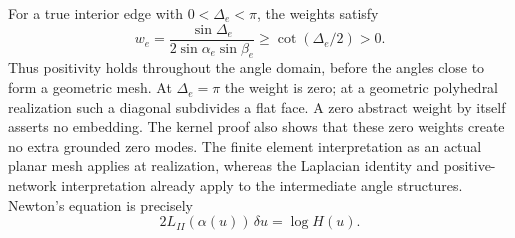 For a true interior edge with $0<\Delta_e<\pi$, the weights satisfy
\begin{equation}
 w_e=\frac{\sin\Delta_e}{2\sin\alpha_e\sin\beta_e}
       \ge\cot(\Delta_e/2)>0.
 \label{eq:ipolyWeightLower}
\end{equation}
Thus positivity holds throughout the angle domain, before the angles
close to form a geometric mesh. At $\Delta_e=\pi$ the weight is zero;
at a geometric polyhedral realization such a diagonal subdivides a
flat face. A zero abstract weight by itself asserts no embedding.
The kernel proof also shows that these zero weights create no extra
grounded zero modes. The finite element interpretation
as an actual planar mesh applies at realization, whereas the Laplacian
identity and positive-network interpretation already apply to the
intermediate angle structures. Newton's equation is precisely
\begin{equation}
 2L_{II}(\alpha(u))\,\delta u=\log H(u).
 \label{eq:ipolyNewton}
\end{equation}


